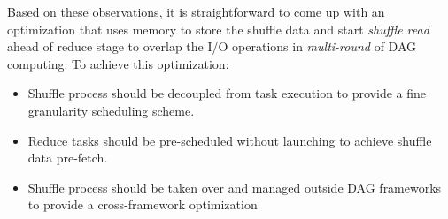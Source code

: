 Based on these observations, it is straightforward to come up with an optimization that uses memory to store the shuffle data and start \textit{shuffle read} ahead of reduce stage to overlap the I/O operations in \textit{multi-round} of DAG computing. To achieve this optimization:
\begin{itemize}
	\item Shuffle process should be decoupled from task execution to provide a fine granularity scheduling scheme.
	\item Reduce tasks should be pre-scheduled without launching to achieve shuffle data pre-fetch.
	\item Shuffle process should be taken over and managed outside DAG frameworks to provide a cross-framework optimization
\end{itemize}
